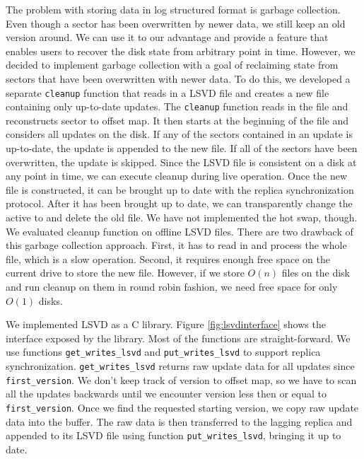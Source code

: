 The problem with storing data in log structured format is garbage collection. Even though a sector has been overwritten by newer data, we still keep an old version around. We can use it to our advantage and provide a feature that enables users to recover the disk state from arbitrary point in time. However, we decided to implement garbage collection with a goal of reclaiming state from sectors that have been overwritten with newer data. To do this, we developed a separate \texttt{cleanup} function that reads in a LSVD file and creates a new file containing only up-to-date updates. The \texttt{cleanup} function reads in the file and reconstructs sector to offset map. It then starts at the beginning of the file and considers all updates on the disk. If any of the sectors contained in an update is up-to-date, the update is appended to the new file. If all of the sectors have been overwritten, the update is skipped. Since the LSVD file is consistent on a disk at any point in time, we can execute cleanup during live operation. Once the new file is constructed, it can be brought up to date with the replica synchronization protocol. After it has been brought up to date, we can transparently change the active to and delete the old file. We have not implemented the hot swap, though. We evaluated cleanup function on offline LSVD files. There are two drawback of this garbage collection approach. First, it has to read in and process the whole file, which is a slow operation. Second, it requires enough free space on the current drive to store the new file. However, if we store $O(n)$ files on the disk and run cleanup on them in round robin fashion, we need free space for only $O(1)$ disks.

We implemented LSVD as a C library. Figure \ref{fig:lsvdinterface} shows the interface exposed by the library. Most of the functions are straight-forward. We use functions \texttt{get\_writes\_lsvd} and \texttt{put\_writes\_lsvd} to support replica synchronization. \texttt{get\_writes\_lsvd} returns raw update data for all updates since \texttt{first\_version}. We don't keep track of version to offset map, so we have to scan all the updates backwards until we encounter version less then or equal to \texttt{first\_version}. Once we find the requested starting version, we copy raw update data into the buffer. The raw data is then transferred to the lagging replica and appended to its LSVD file using function \texttt{put\_writes\_lsvd}, bringing it up to date.

